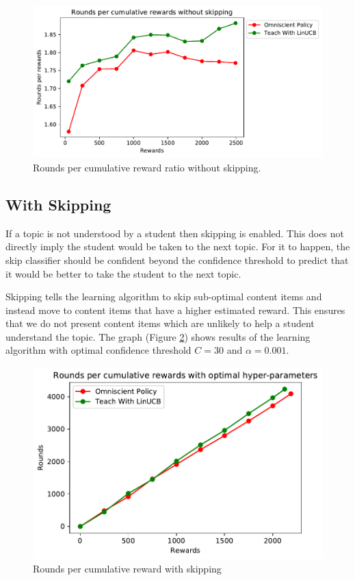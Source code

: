 \begin{figure}[H]
    \centering
    \includegraphics[scale=0.95]{Figures/rounds_per_reward_ratio_no_skipping.pdf}
    \caption{Rounds per cumulative reward ratio without skipping.}
    \label{chap6:rprr_no_skip}
\end{figure}

\subsection{With Skipping}

If a topic is not understood by a student then skipping is enabled. This does not directly imply the student would be taken to the next topic. For it to happen, the skip classifier should be confident beyond the confidence threshold to predict that it would be better to take the student to the next topic. \par 

Skipping tells the learning algorithm to skip sub-optimal content items and instead move to content items that have a higher estimated reward. This ensures that we do not present content items which are unlikely to help a student understand the topic. The graph (Figure \ref{cr_withSkip}) shows results of the learning algorithm with optimal confidence threshold $C = 30$ and $\alpha = 0.001$.

\begin{figure}[H]
    \centering
    \includegraphics[scale=1.0]{Figures/rounds_per_reward_with_skipping.pdf}
    \caption{Rounds per cumulative reward with skipping}
    \label{cr_withSkip}
\end{figure}

